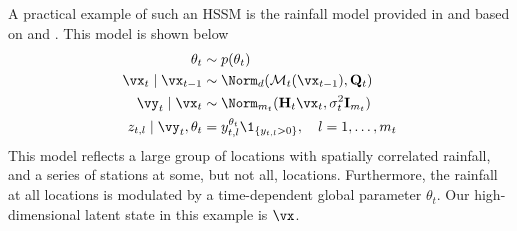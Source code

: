 \documentclass[12pt]{article}
\begin{document}
\begin{example}\label{ex:rainfall}
A practical example of such an HSSM is the rainfall
model provided in \cite{katzfuss2020} and based on 
\cite{sanso1999} and \cite{sigrist2012}. This model is shown below
\begin{align}
    \theta_t &\sim p(\theta_t) \\
    \vx_t \mid \vx_{t-1} &\sim \Norm_d(\mathcal M_t(\vx_{t-1}), \mathbf Q_t) \\
    \vy_t \mid \vx_t &\sim \Norm_{m_t}(\mathbf H_t \vx_t , \sigma^2_t \mathbf I_{m_t})  \\
    z_{t,l} \mid \vy_t ,\theta_t &= y_{t,l}^{\theta_t} \1_{\{y_{t,l} > 0\}}, \quad l = 1, \ldots, m_t 
\end{align}
This model reflects a large group of locations with spatially correlated
rainfall, and a series of stations at some, but not all, locations. Furthermore,
the rainfall at all locations is modulated by a time-dependent global parameter
$\theta_t$. Our high-dimensional latent state in this example is $\vx$.
\end{example}
\end{document}
